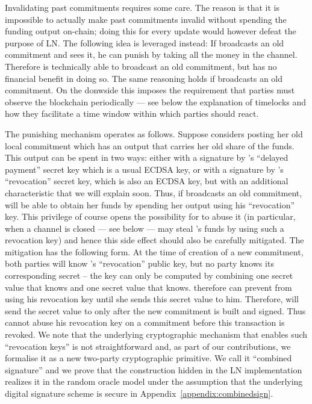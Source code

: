     Invalidating past commitments requires some care. The reason is that it is
    impossible to actually make past commitments invalid without spending the
    funding output on-chain; doing this for every update would however defeat
    the purpose of LN. The following idea is leveraged instead: If \alice{}
    broadcasts an old commitment and \bob{} sees it, he can punish \alice{} by
    taking all the money in the channel. Therefore \alice{} is technically able
    to broadcast an old commitment, but has no financial benefit in doing so.
    The same reasoning holds if \bob{} broadcasts an old commitment. On the
    donwside this imposes the requirement that parties must observe the
    blockchain periodically --- see below the explanation of timelocks and how
    they facilitate a time window within which parties should react.

    The punishing mechanism operates as follows. Suppose \alice{} considers
    posting her old local commitment which has an output that carries her old
    share of the funds. This output can be spent in two ways: either with a
    signature by \alice's ``delayed payment'' secret key which is a usual ECDSA
    key, or with a signature by \bob's ``revocation'' secret key, which is also
    an ECDSA key, but with an additional characteristic that we will explain
    soon. Thus, if \alice{} broadcasts an old commitment, \bob{} will be able to
    obtain her funds by spending her output using his ``revocation'' key. This
    privilege of course opens the possibility for \bob{} to abuse it (in
    particular, when a channel is closed --- see below --- \bob{} may steal
    \alice's funds by using such a revocation key) and hence this side effect
    should also be carefully mitigated. The mitigation has the following form.
    At the time of creation of a new commitment, both parties will know \bob's
    ``revocation'' public key, but no party knows its corresponding secret --
    the key can only be computed by combining one secret value that \alice{}
    knows and one secret value that \bob{} knows. \alice{} therefore can prevent
    \bob{} from using his revocation key until she  sends this secret value to
    him. Therefore, \alice{} will send the secret value to \bob{} only after the
    new commitment is built and signed. Thus \bob{} cannot abuse his revocation
    key on a commitment before this transaction is revoked. We note that the
    underlying cryptographic mechanism  that enables such ``revocation keys'' is
    not straightforward and, as part of our contributions, we formalise it as a
    new two-party cryptographic primitive. We call it ``combined signature'' and
    we prove that the construction hidden in the LN implementation realizes it
    in the random oracle model under the assumption that the underlying digital
    signature scheme is secure in Appendix~\ref{appendix:combinedsign}.

